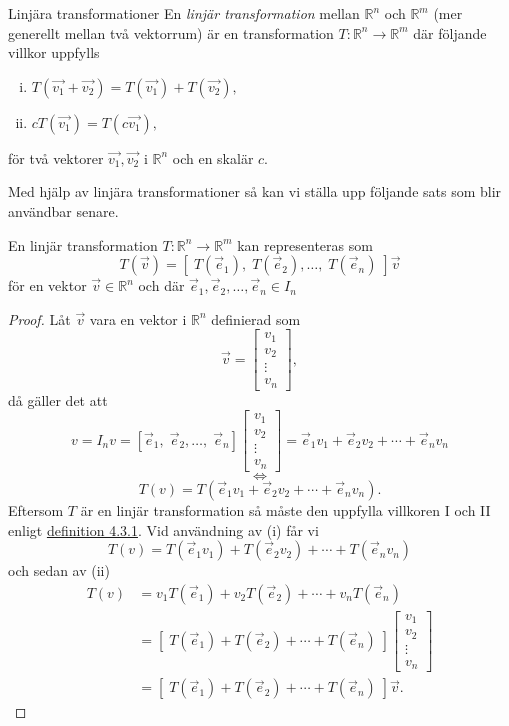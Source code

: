\documentclass{article}
\theoremstyle{definition}
\begin{document}
\hypertarget{linjarT}{}
\begin{mydef}{Linjära transformationer}{}
  En \textit{linjär transformation} mellan $\mathbb{R}^n$ och $\mathbb{R}^m$ (mer generellt
  mellan två vektorrum) är en transformation $T: \mathbb{R}^n \rightarrow \mathbb{R}^m$
  där följande villkor uppfylls
  \begin{enumerate}[(i)]
    \item $T(\vec{v_1} + \vec{v_2}) = T(\vec{v_1}) + T(\vec{v_2}),$
    \item $cT(\vec{v_1}) = T(c \vec{v_1}),$
  \end{enumerate}
  för två vektorer $\vec{v_1}, \vec{v_2}$ 
     i $\mathbb{R}^n$ och en skalär $c.$
\end{mydef}
Med hjälp av linjära transformationer så kan vi ställa upp följande sats som blir användbar senare. 

\hypertarget{linjarTsats}{}
\begin{mytheo}{}{}
  En linjär transformation $T: \mathbb{R}^n \rightarrow \mathbb{R}^m$ kan representeras 
  som 
  \[T(\vec{v}) = [ \; T(\vec{e}_1), \; T(\vec{e}_2), \ldots, \; T(\vec{e}_n) \;] \vec{v}\]
  för en vektor $\vec{v} \in \mathbb{R}^n$ och där $\vec{e}_1, \vec{e}_2, \ldots, \vec{e}_n \in I_n$
\end{mytheo}
\begin{proof}
  Låt $\vec{v}$ vara en vektor i $\mathbb{R}^n$ definierad som
  \[\vec{v} = 
  \begin{bmatrix}
    v_1 \\
    v_2 \\
    \vdots \\
    v_n
  \end{bmatrix},
  \]
  då gäller det att 
  \[
    v = I_n v = [\vec{e}_1, \; \vec{e}_2, \ldots, \; \vec{e}_n] 
    \begin{bmatrix}
      v_1 \\
      v_2 \\
      \vdots \\
      v_n
    \end{bmatrix} = \vec{e}_1 v_1 + \vec{e}_2 v_2 + \cdots + \vec{e}_n v_n 
  \]
  \[\iff\]
  \[
    T(v) = T(\vec{e}_1 v_1 + \vec{e}_2 v_2 + \cdots + \vec{e}_n v_n).
  \]
    Eftersom $T$ är en linjär transformation så måste den uppfylla villkoren I och II enligt
  \hyperlink{linjarT}{definition 4.3.1}. Vid användning av (i) får vi 
  \[T(v) = T(\vec{e}_1 v_1) + T(\vec{e}_2 v_2) + \cdots + T(\vec{e}_n v_n)\]
  och sedan av (ii)
  \begin{align*}
    T(v) &= v_1 T(\vec{e}_1) + v_2 T(\vec{e}_2) + \cdots + v_n T(\vec{e}_n) \\
    &= [ \; T(\vec{e}_1) +  T(\vec{e}_2) + \cdots +  T(\vec{e}_n) \;]
    \begin{bmatrix}
      v_1 \\
      v_2 \\
      \vdots \\
      v_n
    \end{bmatrix} \\
    &=  [ \; T(\vec{e}_1) +  T(\vec{e}_2) + \cdots +  T(\vec{e}_n) \;] \vec{v}.
  \end{align*}
\end{proof}
\end{document}
